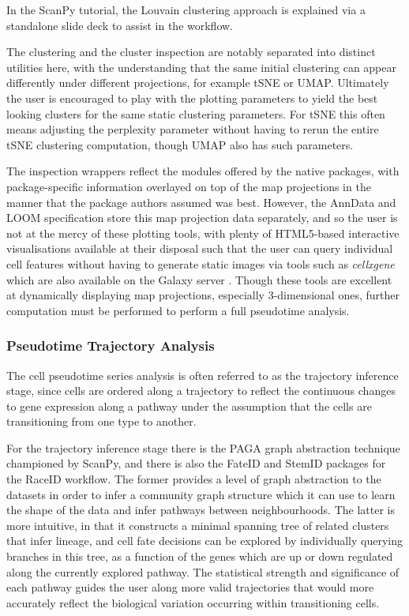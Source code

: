 \documentclass[a4paper,num-refs]{oup-contemporary}
\newcommand{\prog}[1]{\textit{#1}}
\begin{document}
In the ScanPy tutorial, the Louvain clustering approach is explained via a standalone slide deck to assist in the workflow.

The clustering and the cluster inspection are notably separated into distinct utilities here, with the understanding that the same initial clustering can appear differently under different projections, for example tSNE or UMAP. Ultimately the user is encouraged to play with the plotting parameters to yield the best looking clusters for the same static clustering parameters. For tSNE this often means adjusting the perplexity parameter without having to rerun the entire tSNE clustering computation, though UMAP also has such parameters.

The inspection wrappers reflect the modules offered by the native packages, with package-specific information overlayed on top of the map projections in the manner that the package authors assumed was best. However, the AnnData and LOOM specification store this map projection data separately, and so the user is not at the mercy of these plotting tools, with plenty of HTML5-based interactive visualisations available at their disposal such that the user can query individual cell features without having to generate static images via tools such as \prog{cellxgene} which are also available on the Galaxy server \citep{cellxgene}. Though these tools are excellent at dynamically displaying map projections, especially 3-dimensional ones, further computation must be performed to perform a full pseudotime analysis.

\subsubsection{Pseudotime Trajectory Analysis}
The cell pseudotime series analysis is often referred to as the trajectory inference stage, since cells are ordered along a trajectory to reflect the continuous changes to gene expression along a pathway under the assumption that the cells are transitioning from one type to another.

For the trajectory inference stage there is the PAGA graph abstraction technique championed by ScanPy, and there is also the FateID and StemID packages for the RaceID workflow. The former provides a level of graph abstraction to the datasets in order to infer a community graph structure which it can use to learn the shape of the data and infer pathways between neighbourhoods. The latter is more intuitive, in that it constructs a minimal spanning tree of related clusters that infer lineage, and cell fate decisions can be explored by individually querying branches in this tree, as a function of the genes which are up or down regulated along the currently explored pathway. The statistical strength and significance of each pathway guides the user along more valid trajectories that would more accurately reflect the biological variation occurring within transitioning cells.
\end{document}
